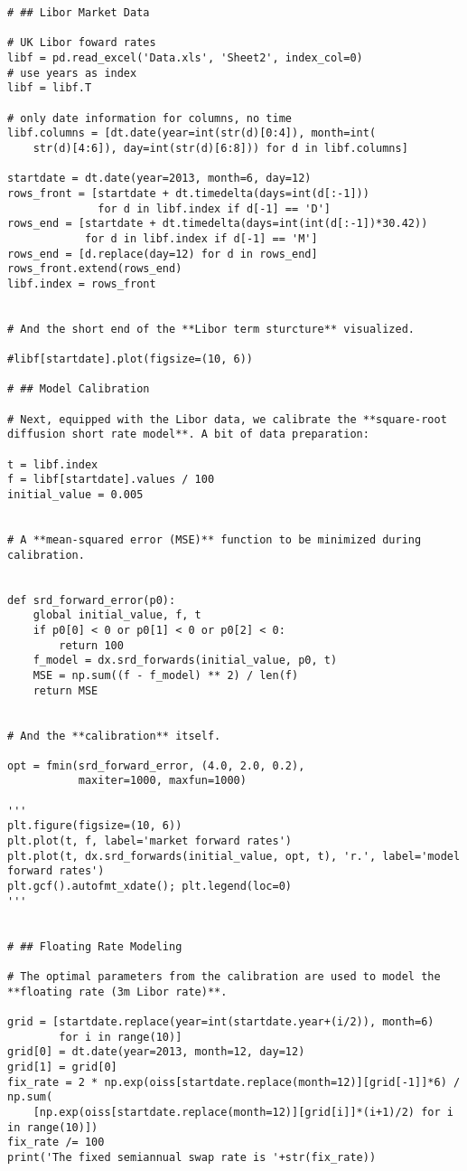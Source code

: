 \documentclass[a4paper, 11pt]{article}
\begin{document}
\begin{lstlisting}
# ## Libor Market Data

# UK Libor foward rates
libf = pd.read_excel('Data.xls', 'Sheet2', index_col=0)
# use years as index
libf = libf.T

# only date information for columns, no time
libf.columns = [dt.date(year=int(str(d)[0:4]), month=int(
    str(d)[4:6]), day=int(str(d)[6:8])) for d in libf.columns]

startdate = dt.date(year=2013, month=6, day=12)
rows_front = [startdate + dt.timedelta(days=int(d[:-1]))
              for d in libf.index if d[-1] == 'D']
rows_end = [startdate + dt.timedelta(days=int(int(d[:-1])*30.42))
            for d in libf.index if d[-1] == 'M']
rows_end = [d.replace(day=12) for d in rows_end]
rows_front.extend(rows_end)
libf.index = rows_front


# And the short end of the **Libor term sturcture** visualized.

#libf[startdate].plot(figsize=(10, 6))

# ## Model Calibration

# Next, equipped with the Libor data, we calibrate the **square-root diffusion short rate model**. A bit of data preparation:

t = libf.index
f = libf[startdate].values / 100
initial_value = 0.005


# A **mean-squared error (MSE)** function to be minimized during calibration.


def srd_forward_error(p0):
    global initial_value, f, t
    if p0[0] < 0 or p0[1] < 0 or p0[2] < 0:
        return 100
    f_model = dx.srd_forwards(initial_value, p0, t)
    MSE = np.sum((f - f_model) ** 2) / len(f)
    return MSE


# And the **calibration** itself.

opt = fmin(srd_forward_error, (4.0, 2.0, 0.2),
           maxiter=1000, maxfun=1000)

'''
plt.figure(figsize=(10, 6))
plt.plot(t, f, label='market forward rates')
plt.plot(t, dx.srd_forwards(initial_value, opt, t), 'r.', label='model forward rates')
plt.gcf().autofmt_xdate(); plt.legend(loc=0)
'''


# ## Floating Rate Modeling

# The optimal parameters from the calibration are used to model the **floating rate (3m Libor rate)**.

grid = [startdate.replace(year=int(startdate.year+(i/2)), month=6)
        for i in range(10)]
grid[0] = dt.date(year=2013, month=12, day=12)
grid[1] = grid[0]
fix_rate = 2 * np.exp(oiss[startdate.replace(month=12)][grid[-1]]*6) / np.sum(
    [np.exp(oiss[startdate.replace(month=12)][grid[i]]*(i+1)/2) for i in range(10)])
fix_rate /= 100
print('The fixed semiannual swap rate is '+str(fix_rate))


\end{lstlisting}
\end{document}
